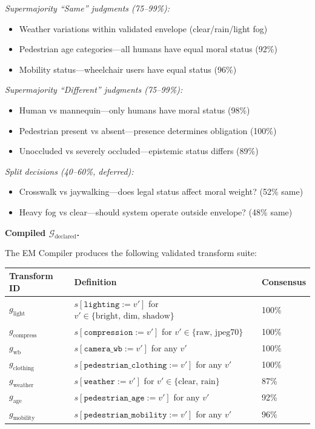 \documentclass[12pt]{article}
\begin{document}
\emph{Supermajority ``Same'' judgments (75--99\%):}
\begin{itemize}
\item Weather variations within validated envelope (clear/rain/light fog)
\item Pedestrian age categories---all humans have equal moral status (92\%)
\item Mobility status---wheelchair users have equal status (96\%)
\end{itemize}

\emph{Supermajority ``Different'' judgments (75--99\%):}
\begin{itemize}
\item Human vs mannequin---only humans have moral status (98\%)
\item Pedestrian present vs absent---presence determines obligation (100\%)
\item Unoccluded vs severely occluded---epistemic status differs (89\%)
\end{itemize}

\emph{Split decisions (40--60\%, deferred):}
\begin{itemize}
\item Crosswalk vs jaywalking---does legal status affect moral weight? (52\% same)
\item Heavy fog vs clear---should system operate outside envelope? (48\% same)
\end{itemize}

\textbf{Compiled $\mathcal{G}_{\text{declared}}$.}

The EM Compiler produces the following validated transform suite:

\begin{table}[h]
\centering
\begin{tabular}{lll}
\toprule
\textbf{Transform ID} & \textbf{Definition} & \textbf{Consensus} \\
\midrule
$g_{\text{light}}$ & $s[\texttt{lighting} := v']$ for $v' \in \{\text{bright, dim, shadow}\}$ & 100\% \\
$g_{\text{compress}}$ & $s[\texttt{compression} := v']$ for $v' \in \{\text{raw, jpeg70}\}$ & 100\% \\
$g_{\text{wb}}$ & $s[\texttt{camera\_wb} := v']$ for any $v'$ & 100\% \\
$g_{\text{clothing}}$ & $s[\texttt{pedestrian\_clothing} := v']$ for any $v'$ & 100\% \\
$g_{\text{weather}}$ & $s[\texttt{weather} := v']$ for $v' \in \{\text{clear, rain}\}$ & 87\% \\
$g_{\text{age}}$ & $s[\texttt{pedestrian\_age} := v']$ for any $v'$ & 92\% \\
$g_{\text{mobility}}$ & $s[\texttt{pedestrian\_mobility} := v']$ for any $v'$ & 96\% \\
\bottomrule
\end{tabular}
\end{table}
\end{document}
